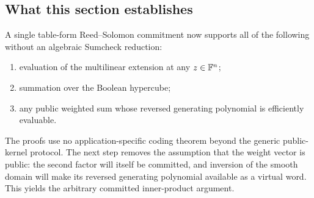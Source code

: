 \subsection{What this section establishes}
\label{sec:linear-functionals-summary}

A single table-form Reed--Solomon commitment now supports all of the following without an algebraic Sumcheck reduction:
\begin{enumerate}[leftmargin=*]
  \item evaluation of the multilinear extension at any \(z\in\mathbb{F}^n\);
  \item summation over the Boolean hypercube;
  \item any public weighted sum whose reversed generating polynomial is efficiently evaluable.
\end{enumerate}
The proofs use no application-specific coding theorem beyond the generic public-kernel protocol.  The next step removes the assumption that the weight vector is public: the second factor will itself be committed, and inversion of the smooth domain will make its reversed generating polynomial available as a virtual word.  This yields the arbitrary committed inner-product argument.
